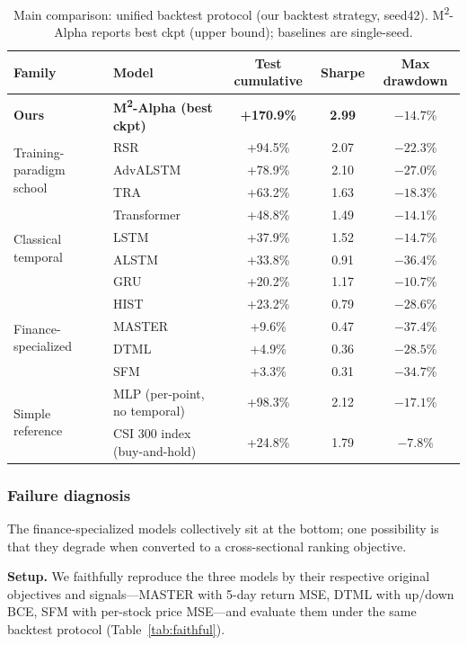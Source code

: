 \documentclass[a4paper,11pt]{article}
\newcommand{\msqa}{\texorpdfstring{M\textsuperscript{2}-Alpha}{M2-Alpha}} %
\begin{document}
\begin{table}[H]
\centering
\caption{Main comparison: unified backtest protocol (our backtest strategy,
seed42). \msqa{} reports best ckpt (upper bound); baselines are single-seed.}
\label{tab:main}
\begin{tabular}{llccc}
\toprule
Family & Model & Test cumulative & Sharpe & Max drawdown \\
\midrule
\textbf{Ours} & \textbf{\msqa{} (best ckpt)} & \textbf{+170.9\%} & \textbf{2.99} & $-14.7\%$ \\
\midrule
\multirow{3}{*}{Training-paradigm school}
 & RSR        & +94.5\% & 2.07 & $-22.3\%$ \\
 & AdvALSTM   & +78.9\% & 2.10 & $-27.0\%$ \\
 & TRA        & +63.2\% & 1.63 & $-18.3\%$ \\
\midrule
\multirow{4}{*}{Classical temporal}
 & Transformer & +48.8\% & 1.49 & $-14.1\%$ \\
 & LSTM        & +37.9\% & 1.52 & $-14.7\%$ \\
 & ALSTM       & +33.8\% & 0.91 & $-36.4\%$ \\
 & GRU         & +20.2\% & 1.17 & $-10.7\%$ \\
\midrule
\multirow{4}{*}{Finance-specialized}
 & HIST   & +23.2\% & 0.79 & $-28.6\%$ \\
 & MASTER & +9.6\%  & 0.47 & $-37.4\%$ \\
 & DTML   & +4.9\%  & 0.36 & $-28.5\%$ \\
 & SFM    & +3.3\%  & 0.31 & $-34.7\%$ \\
\midrule
\multirow{2}{*}{Simple reference}
 & MLP (per-point, no temporal) & +98.3\% & 2.12 & $-17.1\%$ \\
 & CSI 300 index (buy-and-hold) & +24.8\% & 1.79 & $-7.8\%$ \\
\bottomrule
\end{tabular}
\end{table}

\subsubsection{Failure diagnosis}\label{sec:main-diag}
The finance-specialized models collectively sit at the bottom; one possibility
is that they degrade when converted to a cross-sectional ranking objective.

\textbf{Setup.} We faithfully reproduce the three models by their
respective original objectives and signals---MASTER with 5-day return MSE, DTML
with up/down BCE, SFM with per-stock price MSE---and evaluate them under the
same backtest protocol (Table~\ref{tab:faithful}).
\end{document}
